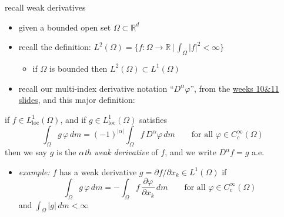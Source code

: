 \documentclass[10pt,
               svgnames,
               hyperref={colorlinks,
                         citecolor=DeepPink4,
                         linkcolor=FireBrick,
                         urlcolor=blue},
               usepdftitle=false]{beamer}
\newcommand{\RR}{\mathbb{R}}
\newcommand{\Lloc}{L_{\text{loc}}^1}
\begin{document}
\begin{frame}{recall weak derivatives}

\begin{itemize}
\item given a bounded open set $\Omega\subset \RR^d$
\item recall the definition: $L^2(\Omega) = \{f:\Omega\to\RR\,\big|\,\int_\Omega |f|^2 <\infty\}$
   \begin{itemize}
   \item[$\circ$] if $\Omega$ is bounded then $L^2(\Omega) \subset L^1(\Omega)$
   \end{itemize}
\item recall our multi-index derivative notation ``$D^\alpha \varphi$'', from the \href{https://bueler.github.io/fa/assets/slides/S26/week10.pdf}{weeks 10\&11 slides}, and this major definition:
\end{itemize}

\begin{definition}
\small
if $f\in \Lloc(\Omega)$, and if $g\in \Lloc(\Omega)$ satisfies
    $$\int_\Omega g\, \varphi\,dm = (-1)^{|\alpha|} \int_\Omega f\, D^\alpha\varphi\,dm \qquad \text{for all } \varphi \in C_c^\infty(\Omega)$$
then we say $g$ is the \emph{$\alpha$th weak derivative} of $f$, and we write $D^\alpha f = g$ a.e.
\end{definition}

\begin{itemize}
\item \emph{example:} $f$ has a weak derivative $g=\partial f/\partial x_k \in L^1(\Omega)$ if
    $$\int_\Omega g\, \varphi\,dm = - \int_\Omega f\, \frac{\partial\varphi}{\partial x_k}\,dm \qquad \text{for all } \varphi \in C_c^\infty(\Omega)$$
and $\int_\Omega|g|\,dm < \infty$
\end{itemize}
\end{frame}
\end{document}
